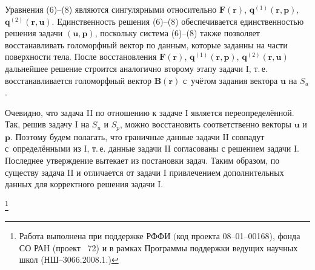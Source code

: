  
 
Уравнения (6)--(8) являются сингулярными относительно  $\boldsymbol F(\boldsymbol r)$, $\boldsymbol {q}^{(1)}(\boldsymbol r, \boldsymbol p)$, $\boldsymbol{q}^{(2)}(\boldsymbol r, \boldsymbol u)$. 
Единственность решения (6)--(8) обеспечивается единственностью решения задачи  $(\boldsymbol{u}, \boldsymbol{p})$, поскольку система (6)--(8) также
 позволяет восстанавливать голоморфный вектор по данным, которые заданны  на части поверхности тела. 
После восстановления $\boldsymbol F( \boldsymbol r)$, $\boldsymbol {q}^{(1)}(\boldsymbol r, \boldsymbol p)$,
$\boldsymbol{q}^{(2)}(\boldsymbol r, \boldsymbol u)$ дальнейшее решение строится аналогично второму этапу 
задачи {\sc I}, т.\,е. восстанавливается голоморфный вектор $\boldsymbol B( \boldsymbol r)$ с~учётом 
задания вектора $\boldsymbol u $ на $ S_{u}$.

Очевидно, что задача  {\sc II} по отношению к задаче {\sc I} является переопределённой. 
Так, решив задачу {\sc I} на $ S_{u}$ и $S_{p}$, можно восстановить соответственно векторы $\boldsymbol u$ и $\boldsymbol p$. 
Поэтому будем полагать, что граничные данные задачи {\sc II} совпадут с~определёнными из {\sc I},
т.\,е. данные задачи {\sc II} согласованы с решением задачи {\sc I}.
  Последнее утверждение  вытекает из постановки задач. Таким образом, по существу 
  задача {\sc II} и отличается от задачи {\sc I} привлечением 
  дополнительных данных  для корректного решения задачи {\sc I}. 


\thanks{Работа выполнена при поддержке РФФИ $($код проекта {\rm 08--01--00168),} фонда СО РАН {\rm(}проект {\rm\No~72)} и в рамках
Программы поддержки ведущих научных школ {\rm(НШ--3066.2008.1.)}}



